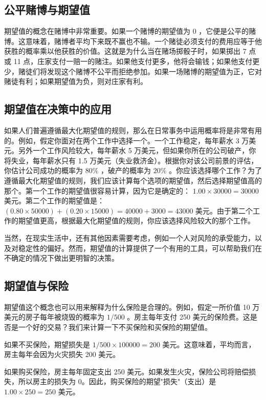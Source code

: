 \subsection{公平赌博与期望值}

期望值的概念在赌博中非常重要。如果一个赌博的期望值为 0 ，它便是公平的赌博。这意味着，赌博者平均下来既不赢也不输。一个赌徒必须支付的费用应等于他获胜的概率乘以他获胜的价值。这就是为什么当在赌场掷骰子时，如果掷出 7 点或 11 点，庄家支付一赔一的赌注。如果他支付更多，他将会输钱；如果他支付更少，赌徒们将发现这个赌博不公平而拒绝参加。如果一场赌博的期望值为正，它对赌徒有利；如果期望值为负，则对庄家有利。

\subsection{期望值在决策中的应用}

如果人们普遍遵循最大化期望值的规则，那么在日常事务中运用概率将是非常有用的。例如，假定你面对在两个工作中选择一个。一个工作稳定，每年薪水 3 万美元。另外一个工作风险较大，每年薪水 5 万美元，但如果你所在的公司破产，你将失业，每年薪水只有 1.5 万美元（失业救济金）。根据你对该公司前景的评估，你估计公司成功的概率为 $80\%$ ，破产的概率为 $20\%$ 。你应该选择哪个工作？为了遵循最大化期望值的规则，我们应该计算每个选项的期望值，然后选择期望值高的那个。第一个工作的期望值很容易计算，因为它是确定的： $1.00 \times 30000=30000$ 美元。第二个工作的期望值是： $(0.80 \times 50000)+(0.20 \times 15000)=40000+3000=43000$ 美元。由于第二个工作的期望值更高，根据最大化期望值的规则，你应该选择风险较大的那个工作。

当然，在现实生活中，还有其他因素需要考虑，例如一个人对风险的承受能力，以及对稳定性的偏好。然而，期望值的计算提供了一个有用的工具，可以帮助我们在不确定的情况下做出更明智的决策。

\subsection{期望值与保险}

期望值这个概念也可以用来解释为什么保险是合理的。例如，假定一所价值 10 万美元的房子每年被烧毁的概率为 $1 / 500$ 。房主每年支付 250 美元的保险费。这是否是一个好的交易？我们来计算一下不买保险和买保险的期望值。

如果不买保险，期望损失是 $1 / 500 \times 100000 = 200$ 美元。这意味着，平均而言，房主每年会因为火灾损失 200 美元。

如果购买保险，房主每年固定支出 250 美元。如果发生火灾，保险公司将赔偿损失，所以房主的损失为 0。因此，购买保险的期望"损失"（支出）是 $1.00 \times 250 = 250$ 美元。

